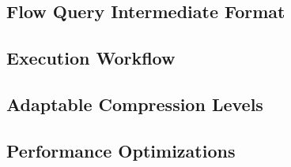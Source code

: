 \subsection{Flow Query Intermediate Format}


\subsection{Execution Workflow}


\subsection{Adaptable Compression Levels}


\subsection{Performance Optimizations}

